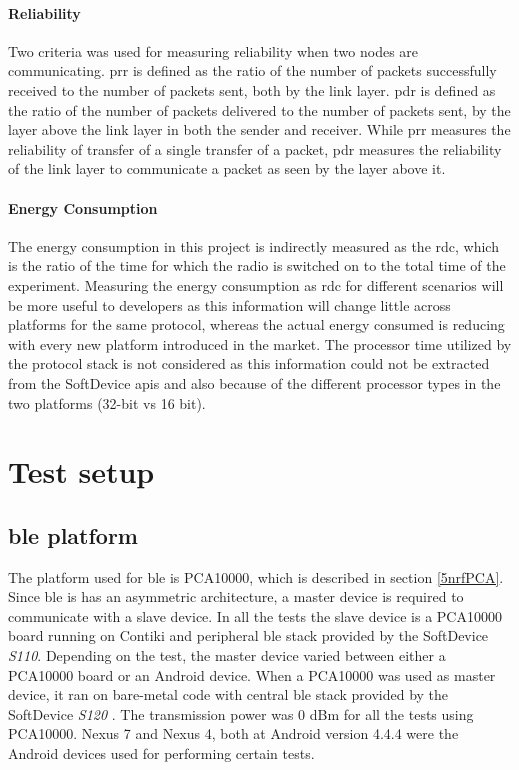 \paragraph{Reliability}
Two criteria was used for measuring reliability when two nodes are communicating. \gls{prr} is defined as the ratio of the number of packets successfully received to the number of packets sent, both by the link layer. \gls{pdr} is defined as the ratio of the number of packets delivered to the number of packets sent, by the layer above the link layer in both the sender and receiver. While \gls{prr} measures the reliability of transfer of a single transfer of a packet, \gls{pdr} measures the reliability of the link layer to communicate a packet as seen by the layer above it.

\paragraph{Energy Consumption}
The energy consumption in this project is indirectly measured as the \acrfull{rdc}, which is the ratio of the time for which the radio is switched on to the total time of the experiment. Measuring the energy consumption as \gls{rdc} for different scenarios will be more useful to developers as this information will change little across platforms for the same protocol, whereas the actual energy consumed is reducing with every new platform introduced in the market. The processor time utilized by the protocol stack is not considered as this information could not be extracted from the SoftDevice \glspl{api} and also because of the different processor types in the two platforms (32-bit vs 16 bit). 


\section{Test setup} \label{6TestPlatforms}

\subsection{\gls{ble} platform}
The platform used for \gls{ble} is PCA10000, which is described in section \ref{5nrfPCA}. Since \gls{ble}  is has an asymmetric architecture, a master device is required to communicate with a slave device. In all the tests the slave device is a PCA10000 board running on Contiki and peripheral \gls{ble}  stack provided by the SoftDevice \emph{S110}. Depending on the test, the master device varied between either a PCA10000 board or an Android device. When a PCA10000 was used as master device, it ran on bare-metal code with central \gls{ble} stack provided by the SoftDevice \emph{S120} . The transmission power was 0 dBm for all the tests using PCA10000. Nexus 7 and Nexus 4, both at Android version 4.4.4 were the Android devices used for performing certain tests.

